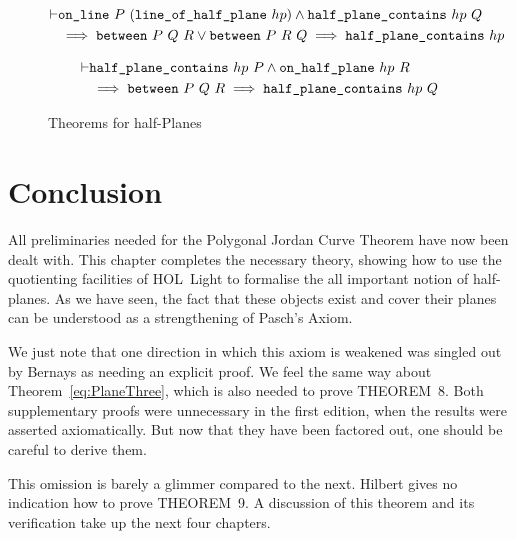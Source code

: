 \begin{figure}
  \begin{equation}\label{eq:betOnHalfPlane1}
    \begin{split}
      \vdash&\texttt{on\_line}\ P\ (\texttt{line\_of\_half\_plane}\ hp) \wedge \texttt{half\_plane\_contains}\ hp\ Q\\
      &\implies \texttt{between}\ P\ Q\ R \vee \texttt{between}\ P\ R\ Q \implies \texttt{half\_plane\_contains}\ hp
    \end{split}
  \end{equation}
  
  \begin{equation}\label{eq:betOnHalfPlane2}
    \begin{split}
      \vdash&\texttt{half\_plane\_contains}\ hp\ P \wedge \texttt{on\_half\_plane}\ hp\ R\\
      &\implies \texttt{between}\ P\ Q\ R \implies \texttt{half\_plane\_contains}\ hp\ Q
    \end{split}
  \end{equation}
\caption{Theorems for half-Planes}
\label{fig:HalfPlanesAdditional}
\end{figure}
\section{Conclusion}
All preliminaries needed for the Polygonal Jordan Curve Theorem have now been dealt with. This chapter completes the necessary theory, showing how to use the quotienting facilities of HOL~Light to formalise the all important notion of half-planes. As we have seen, the fact that these objects exist and cover their planes can be understood as a strengthening of Pasch's Axiom.

We just note that one direction in which this axiom is weakened  was singled out by Bernays as needing an explicit proof. We feel the same way about Theorem~\ref{eq:PlaneThree}, which is also needed to prove THEOREM~8. Both supplementary proofs were unnecessary in the first edition, when the results were asserted axiomatically. But now that they have been factored out, one should be careful to derive them.

This omission is barely a glimmer compared to the next. Hilbert gives no indication how to prove THEOREM~9. A discussion of this theorem and its verification take up the next four chapters.


